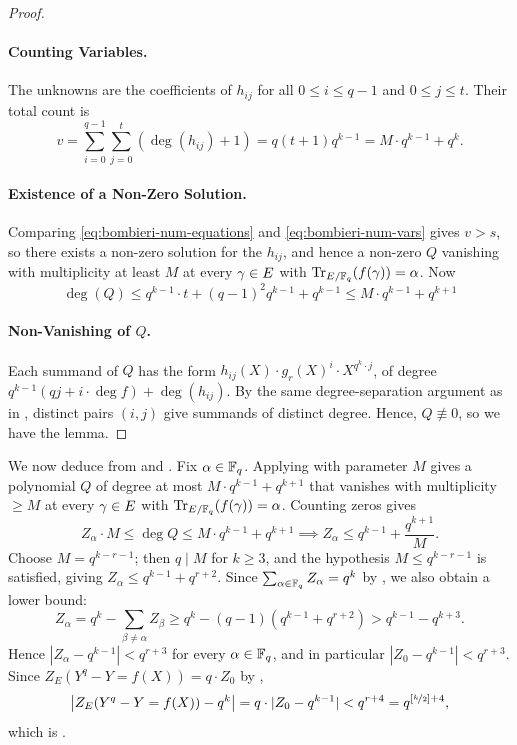 \begin{proof}
  \paragraph*{Counting Variables.} The unknowns are the coefficients of $h_{ij}$ for all $0\leq i\leq q-1$ and $0\leq j\leq t$. Their total count is \begin{equation}\label{eq:bombieri-num-vars}
    v=\sum_{i=0}^{q-1}\sum_{j=0}^t (\deg(h_{ij})+1)=q(t+1)q^{k-1}=M\cdot q^{k-1}+q^k.
  \end{equation}

  \paragraph*{Existence of a Non-Zero Solution.} Comparing \eqref{eq:bombieri-num-equations} and \eqref{eq:bombieri-num-vars} gives $v>s$, so there exists a non-zero solution for the $h_{ij}$, and hence a non-zero $Q$ vanishing with multiplicity at least $M$ at every $\gamma\in E$ with $\operatorname{Tr}_{E/\mathbb{F}_q}(f(\gamma))=\alpha$. Now $$\deg(Q)\leq q^{k-1}\cdot t+(q-1)^2q^{k-1}+q^{k-1}\leq M\cdot q^{k-1}+q^{k+1}$$

  \paragraph*{Non-Vanishing of $Q$.} Each summand of $Q$ has the form $h_{ij}(X)\cdot g_r(X)^i\cdot X^{q^k\cdot j}$, of degree $q^{k-1}(qj+i\cdot\deg f)+\deg(h_{ij})$. By the same degree-separation argument as in \StepanovLinIndeplem, distinct pairs $(i,j)$ give summands of distinct degree. Hence, $Q\not\equiv 0$, so we have the lemma.
\end{proof}

We now deduce \Bombieri from \BombieriQExistslem and \BombieriTraceCountlem. Fix $\alpha\in\mathbb{F}_q$. Applying \BombieriQExistslem with parameter $M$ gives a polynomial $Q$ of degree at most $M\cdot q^{k-1}+q^{k+1}$ that vanishes with multiplicity $\geq M$ at every $\gamma\in E$ with $\operatorname{Tr}_{E/\mathbb{F}_q}(f(\gamma))=\alpha$. Counting zeros gives
$$Z_{\alpha}\cdot M\leq\deg Q\leq M\cdot q^{k-1}+q^{k+1}\implies Z_{\alpha}\leq q^{k-1}+\frac{q^{k+1}}{M}.$$
Choose $M=q^{k-r-1}$; then $q\mid M$ for $k\geq 3$, and the hypothesis $M\leq q^{k-r-1}$ is satisfied, giving $Z_{\alpha}\leq q^{k-1}+q^{r+2}$. Since $\sum_{\alpha\in\mathbb{F}_q}Z_{\alpha}=q^k$ by \BombieriTraceCountlem, we also obtain a lower bound:
$$Z_{\alpha}=q^k-\sum_{\beta\neq\alpha}Z_{\beta}\geq q^k-(q-1)(q^{k-1}+q^{r+2})>q^{k-1}-q^{k+3}.$$
Hence $|Z_{\alpha}-q^{k-1}|<q^{r+3}$ for every $\alpha\in\mathbb{F}_q$, and in particular $|Z_0-q^{k-1}|<q^{r+3}$. Since $Z_E(Y^q-Y=f(X))=q\cdot Z_0$ by \BombieriTraceCountlem,
$$\left|Z_E(Y^q-Y=f(X))-q^k\right|=q\cdot|Z_0-q^{k-1}|<q^{r+4}=q^{\left[\nicefrac{k}2\right]+4},$$
which is \Bombieri.

